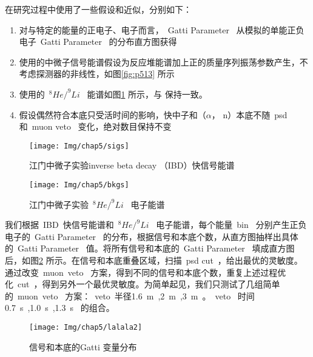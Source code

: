 在研究过程中使用了一些假设和近似，分别如下：
\begin{enumerate}
\item 对与特定的能量的正电子、电子而言，~Gatti Parameter~ 从模拟的单能正负电子~Gatti Parameter~ 的分布直方图获得
\item 使用的中微子信号能谱假设为反应堆能谱加上正的质量序列振荡参数产生，不考虑探测器的非线性，如图\ref{fig:p513} 所示
\item 使用的~$^{8}He/^{9}Li$~ 能谱如图\ref{fig:p514} 所示，与\citep{an2015neutrino} 保持一致。
\item 假设偶然符合本底只受活时间的影响，快中子和（$\alpha$， n）本底不随~psd~ 和~muon veto~ 变化，绝对数目保持不变
\end{enumerate}
\begin{figure}[!htb]
\begin{minipage}[t]{0.48\linewidth}
    \centering
    \texttt{[image: Img/chap5/sigs]}
    \caption{江门中微子实验inverse beta decay （IBD）快信号能谱}
    \label{fig:p513}
\end{minipage}
\quad\quad
\begin{minipage}[t]{0.48\linewidth}
    \centering
    \texttt{[image: Img/chap5/bkgs]}
    \caption{江门中微子实验~$^{8}He/^{9}Li$~ 电子能谱}
    \label{fig:p514}
\end{minipage}
\end{figure}

我们根据~IBD~快信号能谱和~$^{8}He/^{9}Li$~ 电子能谱，每个能量~bin~ 分别产生正负电子的~Gatti Parameter~ 的分布，根据信号和本底个数，从直方图抽样出具体的~Gatti Parameter~ 值。将所有信号和本底的~Gatti Parameter~ 填成直方图后，如图\ref{fig:p519} 所示。在信号和本底重叠区域，扫描~psd cut~，给出最优的灵敏度。通过改变~muon~veto~ 方案，得到不同的信号和本底个数，重复上述过程优化~cut~，得到另外一个最优灵敏度。为简单起见，我们只测试了几组简单的~muon~veto~ 方案：~veto~半径1.6~m~,2~m~,3~m~。~veto~ 时间0.7~s~,1.0~s~,1.3~s~ 的组合。
\begin{figure}[!htbp]
  \centering
   \texttt{[image: Img/chap5/lalala2]}
    \caption{信号和本底的Gatti 变量分布}
  \label{fig:p519}
\end{figure}
